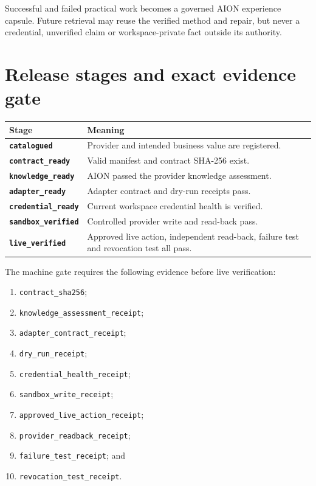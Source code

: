 \documentclass[11pt,a4paper]{article}
\newcommand{\code}[1]{\texttt{#1}}
\begin{document}
Successful and failed practical work becomes a governed AION experience
capsule. Future retrieval may reuse the verified method and repair, but never a
credential, unverified claim or workspace-private fact outside its authority.

\section{Release stages and exact evidence gate}

\begin{longtable}{>{\bfseries}p{36mm}p{115mm}}
\toprule
Stage & Meaning \\
\midrule
\code{catalogued} & Provider and intended business value are registered. \\
\code{contract\_ready} & Valid manifest and contract SHA-256 exist. \\
\code{knowledge\_ready} & AION passed the provider knowledge assessment. \\
\code{adapter\_ready} & Adapter contract and dry-run receipts pass. \\
\code{credential\_ready} & Current workspace credential health is verified. \\
\code{sandbox\_verified} & Controlled provider write and read-back pass. \\
\code{live\_verified} & Approved live action, independent read-back, failure test and revocation test all pass. \\
\bottomrule
\end{longtable}

The machine gate requires the following evidence before live verification:

\begin{enumerate}
  \item \code{contract\_sha256};
  \item \code{knowledge\_assessment\_receipt};
  \item \code{adapter\_contract\_receipt};
  \item \code{dry\_run\_receipt};
  \item \code{credential\_health\_receipt};
  \item \code{sandbox\_write\_receipt};
  \item \code{approved\_live\_action\_receipt};
  \item \code{provider\_readback\_receipt};
  \item \code{failure\_test\_receipt}; and
  \item \code{revocation\_test\_receipt}.
\end{enumerate}
\end{document}
